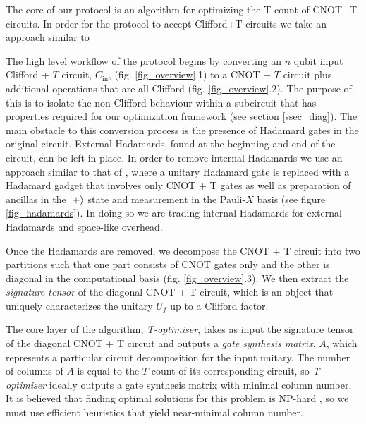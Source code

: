 \documentclass[titlepage]{article}
\theoremstyle{definition}
\theoremstyle{problem}
\theoremstyle{lemma}
\begin{document}
		The core of our protocol is an algorithm for optimizing the T count of CNOT+T circuits. In order for the protocol to accept Clifford+T circuits we take an approach similar to 
		\fi
		
\label{ssec_workflow}

The high level workflow of the protocol begins by converting an $n$ qubit input Clifford + $T$ circuit, $C_{\text{in}}$, (fig. \ref{fig_overview}.1) to a CNOT + $T$ circuit plus additional operations that are all Clifford (fig. \ref{fig_overview}.2). The purpose of this is to isolate the non-Clifford behaviour within a subcircuit that has properties required for our optimization framework (see section \ref{ssec_diag}). The main obstacle to this conversion process is the presence of Hadamard gates in the original circuit. External Hadamards, found at the beginning and end of the circuit, can be left in place. In order to remove internal Hadamards we use an approach similar to that of \cite{1_Montanaro_2017}, \cite{2_Bremner_2010} where a unitary Hadamard gate is replaced with a Hadamard gadget that involves only CNOT + T gates as well as preparation of ancillas in the $\left\vert{+}\right\rangle$ state and measurement in the Pauli-$X$ basis (see figure \ref{fig_hadamards}). In doing so we are trading internal Hadamards for external Hadamards and space-like overhead.

Once the Hadamards are removed, we decompose the CNOT + T circuit into two partitions such that one part consists of CNOT gates only and the other is diagonal in the computational basis (fig. \ref{fig_overview}.3).
We then extract the \emph{signature tensor} of the diagonal CNOT + T circuit, which is an object that uniquely characterizes the unitary $U_f$ up to a Clifford factor. 

The core layer of the algorithm, \emph{T-optimiser}, takes as input the signature tensor of the diagonal CNOT + T circuit and outputs a \emph{gate synthesis matrix}, $A$, which represents a particular circuit decomposition for the input unitary. The number of columns of $A$ is equal to the $T$ count of its corresponding circuit, so \emph{T-optimiser} ideally outputs a gate synthesis matrix with minimal column number. It is believed that finding optimal solutions for this problem is NP-hard \cite{3_Amy_2016}, so we must use efficient heuristics that yield near-minimal column number.
\end{document}
